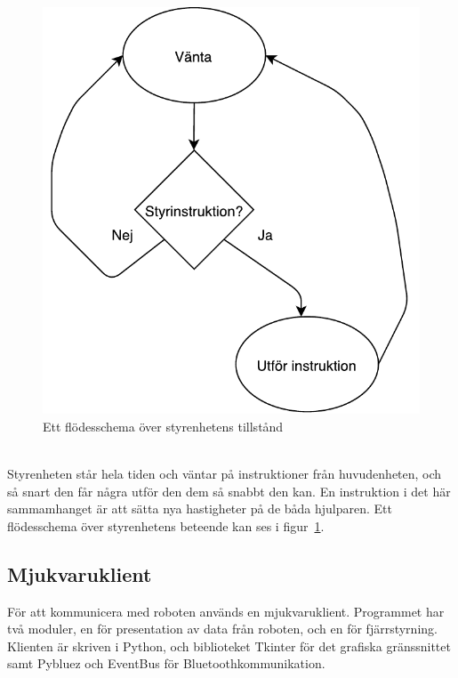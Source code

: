 \documentclass{article}
\begin{document}
\begin{figure}[H]
\centering
\includegraphics[scale=0.6]{styrenhet_flowchart}
\caption{Ett flödesschema över styrenhetens tillstånd}
\label{fig:styrenhet_flowchart}
\end{figure}
\ \\
Styrenheten står hela tiden och väntar på instruktioner från huvudenheten, och så snart den får några utför den dem så snabbt den kan. En instruktion i det här sammamhanget är att sätta nya hastigheter på de båda hjulparen. Ett flödesschema över styrenhetens beteende kan ses i figur~\ref{fig:styrenhet_flowchart}.

\subsection{Mjukvaruklient}
För att kommunicera med roboten används en mjukvaruklient. Programmet har två moduler, en för presentation av data från roboten, och en för fjärrstyrning. Klienten är skriven i Python, och biblioteket Tkinter för det grafiska gränssnittet samt Pybluez och EventBus för Bluetoothkommunikation. 
\end{document}
